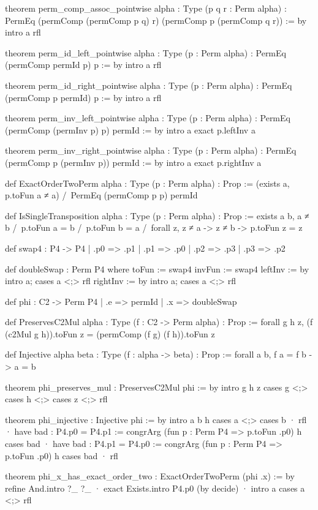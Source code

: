 \documentclass[11pt]{article}
\begin{document}
\begin{Vlean}
theorem perm_comp_assoc_pointwise {alpha : Type} (p q r : Perm alpha) :
    PermEq (permComp (permComp p q) r) (permComp p (permComp q r)) := by
  intro a
  rfl

theorem perm_id_left_pointwise {alpha : Type} (p : Perm alpha) :
    PermEq (permComp permId p) p := by
  intro a
  rfl

theorem perm_id_right_pointwise {alpha : Type} (p : Perm alpha) :
    PermEq (permComp p permId) p := by
  intro a
  rfl

theorem perm_inv_left_pointwise {alpha : Type} (p : Perm alpha) :
    PermEq (permComp (permInv p) p) permId := by
  intro a
  exact p.leftInv a

theorem perm_inv_right_pointwise {alpha : Type} (p : Perm alpha) :
    PermEq (permComp p (permInv p)) permId := by
  intro a
  exact p.rightInv a

def ExactOrderTwoPerm {alpha : Type} (p : Perm alpha) : Prop :=
  (exists a, p.toFun a ≠ a) /\ PermEq (permComp p p) permId

def IsSingleTransposition {alpha : Type} (p : Perm alpha) : Prop :=
  exists a b,
    a ≠ b /\
    p.toFun a = b /\
    p.toFun b = a /\
    forall z, z ≠ a -> z ≠ b -> p.toFun z = z

def swap4 : P4 -> P4
  | .p0 => .p1
  | .p1 => .p0
  | .p2 => .p3
  | .p3 => .p2

def doubleSwap : Perm P4 where
  toFun := swap4
  invFun := swap4
  leftInv := by intro a; cases a <;> rfl
  rightInv := by intro a; cases a <;> rfl

def phi : C2 -> Perm P4
  | .e => permId
  | .x => doubleSwap

def PreservesC2Mul {alpha : Type} (f : C2 -> Perm alpha) : Prop :=
  forall g h z,
    (f (c2Mul g h)).toFun z = (permComp (f g) (f h)).toFun z

def Injective {alpha beta : Type} (f : alpha -> beta) : Prop :=
  forall a b, f a = f b -> a = b

theorem phi_preserves_mul : PreservesC2Mul phi := by
  intro g h z
  cases g <;> cases h <;> cases z <;> rfl

theorem phi_injective : Injective phi := by
  intro a b h
  cases a <;> cases b
  · rfl
  · have bad : P4.p0 = P4.p1 :=
      congrArg (fun p : Perm P4 => p.toFun .p0) h
    cases bad
  · have bad : P4.p1 = P4.p0 :=
      congrArg (fun p : Perm P4 => p.toFun .p0) h
    cases bad
  · rfl

theorem phi_x_has_exact_order_two : ExactOrderTwoPerm (phi .x) := by
  refine And.intro ?_ ?_
  · exact Exists.intro P4.p0 (by decide)
  · intro a
    cases a <;> rfl


\end{Vlean}
\end{document}
